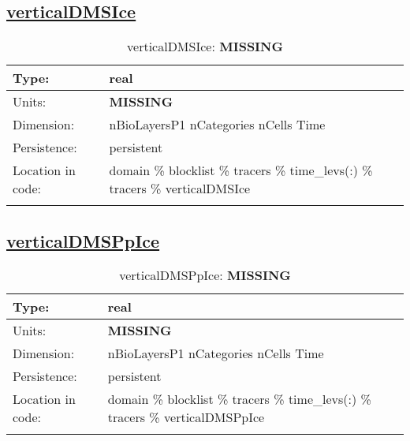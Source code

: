 \subsection[verticalDMSIce]{\hyperref[sec:var_tab_tracers]{verticalDMSIce}}
\label{subsec:var_sec_tracers_verticalDMSIce}
\begin{center}
\begin{longtable}{| p{2.0in} | p{4.0in} |}
        \hline 
        Type: & real \\
        \hline 
        Units: & {\bf \color{red} MISSING} \\
        \hline 
        Dimension: & nBioLayersP1 nCategories nCells Time \\
        \hline 
        Persistence: & persistent \\
        \hline 
         Location in code: & domain \% blocklist \% tracers \% time\_levs(:) \% tracers \% verticalDMSIce \\
         \hline 
    \caption{verticalDMSIce: {\bf \color{red} MISSING}}
\end{longtable}
\end{center}
\subsection[verticalDMSPpIce]{\hyperref[sec:var_tab_tracers]{verticalDMSPpIce}}
\label{subsec:var_sec_tracers_verticalDMSPpIce}
\begin{center}
\begin{longtable}{| p{2.0in} | p{4.0in} |}
        \hline 
        Type: & real \\
        \hline 
        Units: & {\bf \color{red} MISSING} \\
        \hline 
        Dimension: & nBioLayersP1 nCategories nCells Time \\
        \hline 
        Persistence: & persistent \\
        \hline 
         Location in code: & domain \% blocklist \% tracers \% time\_levs(:) \% tracers \% verticalDMSPpIce \\
         \hline 
    \caption{verticalDMSPpIce: {\bf \color{red} MISSING}}
\end{longtable}
\end{center}
